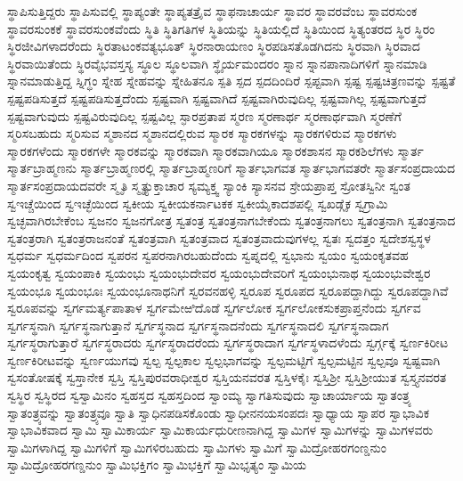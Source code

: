 {ಸ್ಥಾಪಿಸುತ್ತಿದ್ದರು
ಸ್ಥಾಪಿಸುವಲ್ಲಿ
ಸ್ಥಾಪ್ಯಂತೇ
ಸ್ಥಾಪ್ಯತತ್ರೈವ
ಸ್ಥಾಫನಾಚಾರ್ಯ
ಸ್ಥಾವರ
ಸ್ಥಾವರವೆಂಬ
ಸ್ಥಾವರಸುಂಕ
ಸ್ಥಾವರಸುಂಕಕೆ
ಸ್ಥಾವರಸುಂಕವೆಂದು
ಸ್ಥಿತಿ
ಸ್ಥಿತಿಗತಿಗಳ
ಸ್ಥಿತಿಯನ್ನು
ಸ್ಥಿತಿಯಲ್ಲಿದೆ
ಸ್ಥಿತಿಯಿಂದ
ಸ್ಥಿತ್ಯಂತರದ
ಸ್ಥಿರ
ಸ್ಥಿರಂ
ಸ್ಥಿರಜೀವಿಗಳಾದರೆಂದು
ಸ್ಥಿರತಾಟಂಕವತ್ಯಭೂತ್
ಸ್ಥಿರನಾರಾಯಣಂ
ಸ್ಥಿರಪಡಿಸತೊಡಗಿದನು
ಸ್ಥಿರವಾಗಿ
ಸ್ಥಿರವಾದ
ಸ್ಥಿರವಾಯಿತೆಂದು
ಸ್ಥಿರವೈಭವಸ್ತಸ್ಯ
ಸ್ಥೂಲ
ಸ್ಥೂಲವಾಗಿ
ಸ್ಥೈರ್ಯಮಂದರಂ
ಸ್ನಾನ
ಸ್ನಾನಪಾನಾದಿಗಳಿಗೆ
ಸ್ನಾನಮಾಡಿ
ಸ್ನಾನಮಾಡುತ್ತಿದ್ದ
ಸ್ನಿಗ್ಧಂ
ಸ್ನೇಹ
ಸ್ನೇಹವನ್ನು
ಸ್ನೇಹಿತನೂ
ಸ್ಪತಿ
ಸ್ಪದ
ಸ್ಪದದಿಂದಿರೆ
ಸ್ಪಪ್ಟವಾಗಿ
ಸ್ಪಷ್ಟ
ಸ್ಪಷ್ಟಚಿತ್ರಣವನ್ನು
ಸ್ಪಷ್ಟತೆ
ಸ್ಪಷ್ಟಪಡಿಸುತ್ತದೆ
ಸ್ಪಷ್ಟಪಡಿಸುತ್ತದೆಂದು
ಸ್ಪಷ್ಟವಾಗಿ
ಸ್ಪಷ್ಟವಾಗಿದೆ
ಸ್ಪಷ್ಟವಾಗಿರುವುದಿಲ್ಲ
ಸ್ಪಷ್ಟವಾಗಿಲ್ಲ
ಸ್ಪಷ್ಟವಾಗುತ್ತದೆ
ಸ್ಪಷ್ಟವಾಗುವುದು
ಸ್ಪಷ್ಟವಿರುವುದಿಲ್ಲ
ಸ್ಪಷ್ಟವಿಲ್ಲ
ಸ್ಫಾರಪ್ರತಾಪ
ಸ್ಮರಣ
ಸ್ಮರಣಾರ್ಥ
ಸ್ಮರಣಾರ್ಥವಾಗಿ
ಸ್ಮರಣೆಗೆ
ಸ್ಮರಿಸಬಹುದು
ಸ್ಮರಿಸುವ
ಸ್ಮಶಾನದ
ಸ್ಮಶಾನದಲ್ಲಿರುವ
ಸ್ಮಾರಕ
ಸ್ಮಾರಕಗಳನ್ನು
ಸ್ಮಾರಕಗಳಿರುವ
ಸ್ಮಾರಕಗಳು
ಸ್ಮಾರಕಗಳೆಂದು
ಸ್ಮಾರಕಗಳೇ
ಸ್ಮಾರಕವನ್ನು
ಸ್ಮಾರಕವಾಗಿ
ಸ್ಮಾರಕವಾಗಿಯೂ
ಸ್ಮಾರಕಶಾಸನ
ಸ್ಮಾರಕಶಿಲೆಗಳು
ಸ್ಮಾರ್ತ
ಸ್ಮಾರ್ತಬ್ರಾಹ್ಮಣನು
ಸ್ಮಾರ್ತಬ್ರಾಹ್ಮಣರಲ್ಲಿ
ಸ್ಮಾರ್ತಬ್ರಾಹ್ಮಣರಿಗೆ
ಸ್ಮಾರ್ತಭಾಗವತ
ಸ್ಮಾರ್ತಭಾಗವತರೇ
ಸ್ಮಾರ್ತಸಂಪ್ರದಾಯದ
ಸ್ಮಾರ್ತಸಂಪ್ರದಾಯದವರೇ
ಸ್ಮೃತಿ
ಸ್ಮೃತ್ಯುಕ್ತಾಚಾರ
ಸ್ಯಮ್ಯಕ್ತ್ವ
ಸ್ಯಾಂಕಿ
ಸ್ಯಾಸನವ
ಸ್ರೇಯಪ್ರಾಪ್ತ
ಸ್ರೋತಸ್ವಿನೀ
ಸ್ವಂತ
ಸ್ವಇಚ್ಚೆಯಿಂದ
ಸ್ವಇಚ್ಛೆಯಿಂದ
ಸ್ವಕೀಯ
ಸ್ವಕೀಯಕರ್ನಾಟಕಕ
ಸ್ವಕೀಯೈಕಾದಶಪಲ್ಲಿ
ಸ್ವಖಡ್ಗೈಕ
ಸ್ವಗ್ರಾಮಿ
ಸ್ವಚ್ಛವಾಗಿರಬೇಕೆಂಬ
ಸ್ವಜನಂ
ಸ್ವಜನಗೋತ್ರ
ಸ್ವತಂತ್ರ
ಸ್ವತಂತ್ರನಾಗಬೇಕೆಂದು
ಸ್ವತಂತ್ರನಾಗಲು
ಸ್ವತಂತ್ರನಾಗಿ
ಸ್ವತಂತ್ರನಾದ
ಸ್ವತಂತ್ರರಾಗಿ
ಸ್ವತಂತ್ರರಾಜನಂತೆ
ಸ್ವತಂತ್ರವಾಗಿ
ಸ್ವತಂತ್ರವಾದ
ಸ್ವತಂತ್ರವಾದುವುಗಳಲ್ಲ
ಸ್ವತಃ
ಸ್ವದತ್ತಂ
ಸ್ವದೇಶಸ್ವಸ್ಥಳ
ಸ್ವಧರ್ಮ
ಸ್ವಧರ್ಮದಿಂದ
ಸ್ವಪರನ
ಸ್ವಪರನಾಗಿರಬಹುದೆಂದು
ಸ್ವಪ್ನದಲ್ಲಿ
ಸ್ವಭಾನು
ಸ್ವಯಂ
ಸ್ವಯಂಕೃತವಹ
ಸ್ವಯಂಕೃತ್ವ
ಸ್ವಯಂಪಾಕಿ
ಸ್ವಯಂಭು
ಸ್ವಯಂಭುದೇವರ
ಸ್ವಯಂಭುದೇವರಿಗೆ
ಸ್ವಯಂಭುನಾಥ
ಸ್ವಯಂಭುವೇಶ್ವರ
ಸ್ವಯಂಭೂ
ಸ್ವಯಂಭೂಃ
ಸ್ವಯಂಭೂನಾಥನಿಗೆ
ಸ್ವರವನಹಳ್ಳಿ
ಸ್ವರೂಪ
ಸ್ವರೂಪದ
ಸ್ವರೂಪದ್ದಾಗಿದ್ದು
ಸ್ವರೂಪದ್ದಾಗಿವೆ
ಸ್ವರೂಪವನ್ನು
ಸ್ವರ್ಗಮರ್ತ್ಯಪಾತಾಳ
ಸ್ವರ್ಗಮೇಱಿದೊಡೆ
ಸ್ವರ್ಗಲೋಕ
ಸ್ವರ್ಗಲೋಕಸುಕಪ್ರಾಪ್ತನೆಂದು
ಸ್ವರ್ಗವ
ಸ್ವರ್ಗಸ್ಥನಾಗಿ
ಸ್ವರ್ಗಸ್ಥನಾಗುತ್ತಾನೆ
ಸ್ವರ್ಗಸ್ಥನಾದ
ಸ್ವರ್ಗಸ್ಥನಾದನೆಂದು
ಸ್ವರ್ಗಸ್ಥನಾದಲಿ
ಸ್ವರ್ಗಸ್ಥನಾದಾಗ
ಸ್ವರ್ಗಸ್ಥರಾಗುತ್ತಾರೆ
ಸ್ವರ್ಗಸ್ಥರಾದರು
ಸ್ವರ್ಗಸ್ಥರಾದರೆಂದು
ಸ್ವರ್ಗಸ್ಥರಾದಾಗ
ಸ್ವರ್ಗಸ್ಥಳಾದಳೆಂದು
ಸ್ವರ್ಗ್ಗಕ್ಕೆ
ಸ್ವರ್ಣಕಿರೀಟ
ಸ್ವರ್ಣಕಿರೀಟವನ್ನು
ಸ್ವರ್ಣಯುಗವು
ಸ್ವಲ್ಪ
ಸ್ವಲ್ಪಕಾಲ
ಸ್ವಲ್ಪಭಾಗವನ್ನು
ಸ್ವಲ್ಪಮಟ್ಟಿಗೆ
ಸ್ವಲ್ಪಮಟ್ಟಿನ
ಸ್ವಲ್ಪವೂ
ಸ್ವಷ್ಟವಾಗಿ
ಸ್ವಸಂತೋಷಕ್ಕೆ
ಸ್ವಸ್ತಾನೇಕ
ಸ್ವಸ್ತಿ
ಸ್ವಸ್ತಿಪುರವರಾಧೀಶ್ವರ
ಸ್ವಸ್ತಿಯನವರತ
ಸ್ವಸ್ತಿಳಕೈಃ
ಸ್ವಸ್ತಿಶ್ರೀ
ಸ್ವಸ್ತಿಶ್ರೀಯುತ
ಸ್ವಸ್ತ್ಯನವರತ
ಸ್ವಸ್ಥಿರ
ಸ್ವಸ್ಥಿರದ
ಸ್ವಸ್ವಾಮಿನಂ
ಸ್ವಹಸ್ತದ
ಸ್ವಹಸ್ತದಿಂದ
ಸ್ವಾಂಮ್ಯ
ಸ್ವಾಗತಿಸುವುದು
ಸ್ವಾಚಾರ್ಯಾಯ
ಸ್ವಾತಂತ್ರ್ಯ
ಸ್ವಾತಂತ್ರ್ಯವನ್ನು
ಸ್ವಾತಂತ್ರ್ಯವೂ
ಸ್ವಾತಿ
ಸ್ವಾಧಿನಪಡಿಸಕೊಂಡು
ಸ್ವಾಧೀನನಯಸಂಪದಃ
ಸ್ವಾಧ್ಯಾಯ
ಸ್ವಾಪರ
ಸ್ವಾಭಾವಿಕ
ಸ್ವಾಭಾವಿಕವಾದ
ಸ್ವಾಮಿ
ಸ್ವಾಮಿಕಾರ್ಯ
ಸ್ವಾಮಿಕಾರ್ಯಧುರೀಣನಾಗಿದ್ದ
ಸ್ವಾಮಿಗಳ
ಸ್ವಾಮಿಗಳನ್ನು
ಸ್ವಾಮಿಗಳವರು
ಸ್ವಾಮಿಗಳಾಗಿದ್ದ
ಸ್ವಾಮಿಗಳಿಗೆ
ಸ್ವಾಮಿಗಳಿರಬಹುದು
ಸ್ವಾಮಿಗಳು
ಸ್ವಾಮಿಗೆ
ಸ್ವಾಮಿದ್ರೋಹರಗಂಣ್ಡನುಂ
ಸ್ವಾಮಿದ್ರೋಹರಗಣ್ಡನುಂ
ಸ್ವಾಮಿಭಕ್ತಿಗಂ
ಸ್ವಾಮಿಭಕ್ತಿಗೆ
ಸ್ವಾಮಿಭೃತ್ಯಂ
ಸ್ವಾಮಿಯ
}
